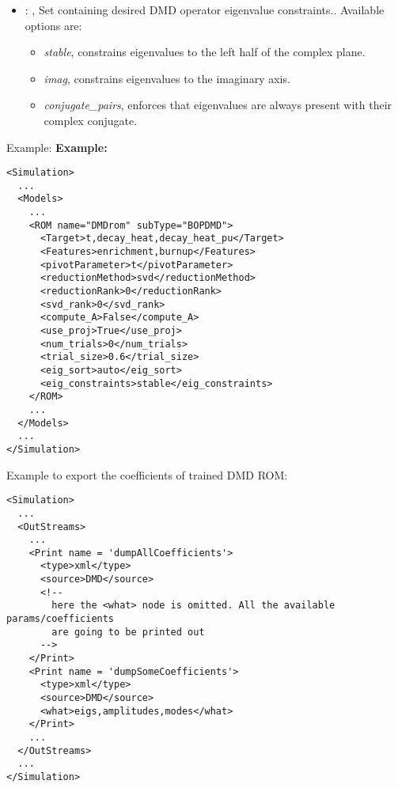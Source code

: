 \begin{itemize}
    \item {}: , 
      Set containing desired DMD operator eigenvalue constraints.. Available options are:
      \begin{itemize}                                                    \item \textit{stable},
      constrains eigenvalues to the left half of the complex plane.
      \item  \textit{imag}, constrains eigenvalues to the imaginary axis.
      \item  \textit{conjugate\_pairs}, enforces that eigenvalues are always present with their
      complex conjugate.                                                  \end{itemize}
  \end{itemize}

\hspace{24pt}
Example:
\textbf{Example:}
\begin{lstlisting}[style=XML,morekeywords={name,subType}]
<Simulation>
  ...
  <Models>
    ...
    <ROM name="DMDrom" subType="BOPDMD">
      <Target>t,decay_heat,decay_heat_pu</Target>
      <Features>enrichment,burnup</Features>
      <pivotParameter>t</pivotParameter>
      <reductionMethod>svd</reductionMethod>
      <reductionRank>0</reductionRank>
      <svd_rank>0</svd_rank>
      <compute_A>False</compute_A>
      <use_proj>True</use_proj>
      <num_trials>0</num_trials>
      <trial_size>0.6</trial_size>
      <eig_sort>auto</eig_sort>
      <eig_constraints>stable</eig_constraints>
    </ROM>
    ...
  </Models>
  ...
</Simulation>
\end{lstlisting}

Example to export the coefficients of trained DMD ROM:
\begin{lstlisting}[style=XML,morekeywords={name,subType}]
<Simulation>
  ...
  <OutStreams>
    ...
    <Print name = 'dumpAllCoefficients'>
      <type>xml</type>
      <source>DMD</source>
      <!--
        here the <what> node is omitted. All the available params/coefficients
        are going to be printed out
      -->
    </Print>
    <Print name = 'dumpSomeCoefficients'>
      <type>xml</type>
      <source>DMD</source>
      <what>eigs,amplitudes,modes</what>
    </Print>
    ...
  </OutStreams>
  ...
</Simulation>
\end{lstlisting}


